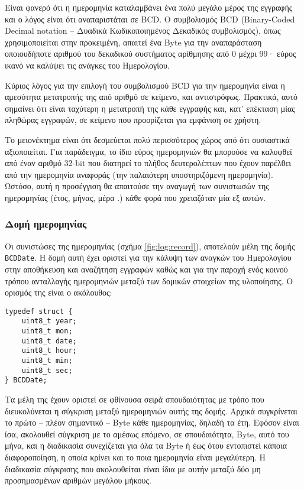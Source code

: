 Είναι φανερό ότι η ημερομηνία καταλαμβάνει ένα πολύ μεγάλο μέρος της εγγραφής
και ο λόγος είναι ότι αναπαριστάται σε BCD. Ο συμβολισμός BCD (Binary-Coded
Decimal notation -- Δυαδικά Κωδικοποιημένος Δεκαδικός συμβολισμός), όπως
χρησιμοποιείται στην προκειμένη, απαιτεί ένα Byte για την αναπαράσταση
οποιουδήποτε αριθμού του δεκαδικού συστήματος αρίθμησης από 0 μέχρι 99· εύρος
ικανό να καλύψει τις ανάγκες του Ημερολογίου.

Κύριος λόγος για την επιλογή του συμβολισμού BCD για την ημερομηνία είναι η
αμεσότητα μετατροπής της από αριθμό σε κείμενο, και αντιστρόφως. Πρακτικά, αυτό
σημαίνει ότι είναι ταχύτερη η μετατροπή της κάθε εγγραφής και, κατ' επέκταση
μίας πληθώρας εγγραφών, σε κείμενο που προορίζεται για εμφάνιση σε χρήστη.

Το μειονέκτημα είναι ότι δεσμεύεται πολύ περισσότερος χώρος από ότι ουσιαστικά
αξιοποιείται. Για παράδειγμα, το ίδιο εύρος ημερομηνιών θα μπορούσε να καλυφθεί
από έναν αριθμό 32-bit που διατηρεί το πλήθος δευτερολέπτων που έχουν παρέλθει
από την ημερομηνία αναφοράς (την παλαιότερη υποστηριζόμενη ημερομηνία). Ωστόσο,
αυτή η προσέγγιση θα απαιτούσε την αναγωγή των συνιστωσών της ημερομηνίας (έτος,
μήνας, μέρα \etc.) κάθε φορά που χρειαζόταν μία εξ αυτών.



\subsubsection{Δομή ημερομηνίας}

Οι συνιστώσες της ημερομηνίας (σχήμα \ref{fig:log:record}), αποτελούν μέλη της
δομής \verb~BCDDate~. Η δομή αυτή έχει οριστεί για την κάλυψη των αναγκών του
Ημερολογίου στην αποθήκευση και αναζήτηση εγγραφών καθώς και για την παροχή ενός
κοινού τρόπου ανταλλαγής ημερομηνιών μεταξύ των δομικών στοιχείων της
υλοποίησης. Ο ορισμός της είναι ο ακόλουθος:
\begin{lstlisting}
typedef struct {
    uint8_t year;
    uint8_t mon;
    uint8_t date;
    uint8_t hour;
    uint8_t min;
    uint8_t sec;
} BCDDate;
\end{lstlisting}

Τα μέλη της έχουν οριστεί σε φθίνουσα σειρά σπουδαιότητας με τρόπο που
διευκολύνεται η σύγκριση μεταξύ ημερομηνιών αυτής της δομής. Αρχικά συγκρίνεται
το πρώτο -- πλέον σημαντικό -- Byte κάθε ημερομηνίας, δηλαδή τα έτη. Εφόσον
είναι ίσα, ακολουθεί σύγκριση με το αμέσως επόμενο, σε σπουδαιότητα, Byte, αυτό
του μήνα, και η διαδικασία συνεχίζεται για όλα τα Byte ή έως ότου εντοπιστεί
κάποια διαφοροποίηση, η οποία κρίνει και το ποια ημερομηνία είναι μεγαλύτερη.
Η διαδικασία σύγκρισης που ακολουθείται είναι ίδια με αυτήν μεταξύ δύο μη
προσημασμένων αριθμών μεγάλου μήκους.

